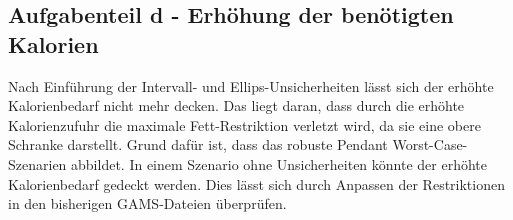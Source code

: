 \documentclass[a4paper,12pt]{article}
\begin{document}
\subsection*{Aufgabenteil d - Erh\"ohung der ben\"otigten Kalorien}

Nach Einf\"uhrung der Intervall- und Ellips-Unsicherheiten l\"asst sich der erh\"ohte Kalorienbedarf nicht mehr decken. Das liegt daran, dass durch die erh\"ohte Kalorienzufuhr die maximale Fett-Restriktion verletzt wird, da sie eine obere Schranke darstellt. Grund daf\"ur ist, dass das robuste Pendant Worst-Case-Szenarien abbildet. In einem Szenario ohne Unsicherheiten k\"onnte der erh\"ohte Kalorienbedarf gedeckt werden.
Dies l\"asst sich durch Anpassen der Restriktionen in den bisherigen GAMS-Dateien \"uberpr\"ufen.

\newpage
\end{document}
